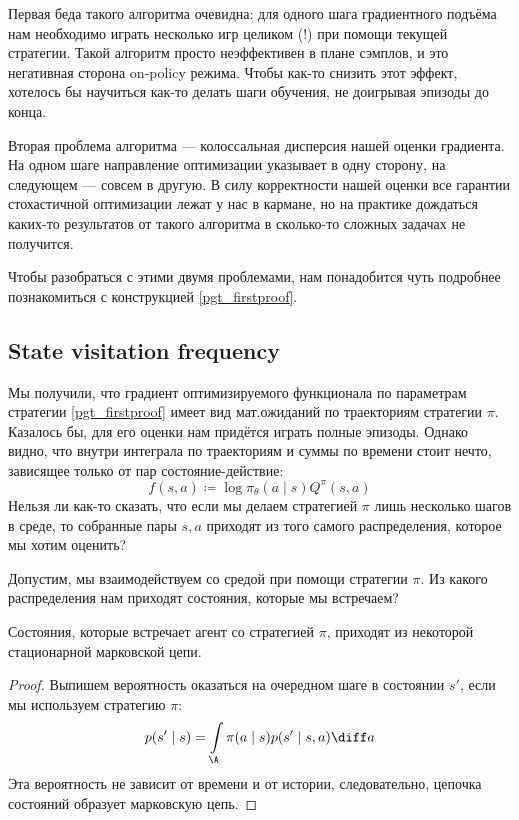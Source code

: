 Первая беда такого алгоритма очевидна: для одного шага градиентного подъёма нам необходимо играть несколько игр целиком (!) при помощи текущей стратегии. Такой алгоритм просто неэффективен в плане сэмплов, и это негативная сторона on-policy режима. Чтобы как-то снизить этот эффект, хотелось бы научиться как-то делать шаги обучения, не доигрывая эпизоды до конца.

Вторая проблема алгоритма --- колоссальная дисперсия нашей оценки градиента. На одном шаге направление оптимизации указывает в одну сторону, на следующем --- совсем в другую. В силу корректности нашей оценки все гарантии стохастичной оптимизации лежат у нас в кармане, но на практике дождаться каких-то результатов от такого алгоритма в сколько-то сложных задачах не получится.

Чтобы разобраться с этими двумя проблемами, нам понадобится чуть подробнее познакомиться с конструкцией \eqref{pgt_firstproof}.

\subsection{State visitation frequency}

Мы получили, что градиент оптимизируемого функционала по параметрам стратегии \eqref{pgt_firstproof} имеет вид мат.ожиданий по траекториям стратегии $\pi$. Казалось бы, для его оценки нам придётся играть полные эпизоды. Однако видно, что внутри интеграла по траекториям и суммы по времени стоит нечто, зависящее только от пар состояние-действие:
$$f(s, a) \coloneqq \log \pi_\theta (a \mid s) Q^\pi(s, a)$$
Нельзя ли как-то сказать, что если мы делаем стратегией $\pi$ лишь несколько шагов в среде, то собранные пары $s, a$ приходят из того самого распределения, которое мы хотим оценить?

Допустим, мы взаимодействуем со средой при помощи стратегии $\pi$. Из какого распределения нам приходят состояния, которые мы встречаем?
\begin{proposition}
Состояния, которые встречает агент со стратегией $\pi$, приходят из некоторой стационарной марковской цепи.
\begin{proof}
Выпишем вероятность оказаться на очередном шаге в состоянии $s'$, если мы используем стратегию $\pi$:
$$p(s' \mid s) = \int\limits_{\A} \pi(a \mid s)p(s' \mid s, a) \diff a$$
Эта вероятность не зависит от времени и от истории, следовательно, цепочка состояний образует марковскую цепь.
\end{proof}
\end{proposition}

